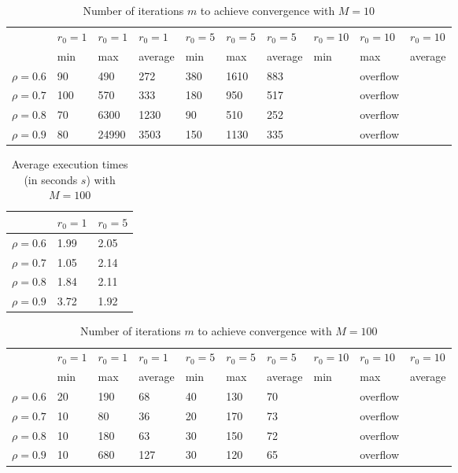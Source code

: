 \documentclass[a4paper,11pt,openright]{report}
\begin{document}
\begin{table}[H]
\centering
\addtolength{\leftskip}{-1.5cm}
\addtolength{\rightskip}{-1.5cm}
\begin{tabular}{|c|lllllllll|}
\hline
$ $ & $r_0 = 1$ & $r_0 = 1$ & $r_0 = 1$ & $r_0 = 5$ & $r_0 = 5$ & $r_0 = 5$ & $r_0 = 10$ & $r_0 = 10$ & $r_0 = 10$  \\
$ $ & min & max & average & min & max & average & min & max & average \\ 
\hline
$\rho = 0.6$ & 90 & 490 & 272 & 380 & 1610 & 883 &  & overflow &  \\

$\rho = 0.7$ & 100 & 570 & 333 & 180 & 950 & 517 &  & overflow &  \\

$\rho = 0.8$ & 70 & 6300 & 1230 & 90 & 510 & 252 &  & overflow & \\

$\rho = 0.9$ & 80 & 24990 & 3503 & 150 & 1130 & 335 &  & overflow & \\
\hline
\end{tabular}
\caption{Number of iterations $m$ to achieve convergence with $M = 10$}
\end{table}
\begin{table}[H]
\centering
\addtolength{\leftskip}{-1.5cm}
\addtolength{\rightskip}{-1.5cm}
\begin{tabular}{|c|ll|}
\hline
$ $ & $r_0 = 1$ & $r_0 = 5$ \\
\hline
$\rho = 0.6$ & 1.99 & 2.05  \\

$\rho = 0.7$ & 1.05 & 2.14  \\

$\rho = 0.8$ & 1.84 & 2.11  \\

$\rho = 0.9$ & 3.72 & 1.92  \\
\hline
\end{tabular}
\caption{Average execution
 times (in seconds $s$) with $M = 100$}
\end{table}
\begin{table}[H]
\centering
\addtolength{\leftskip}{-1.5cm}
\addtolength{\rightskip}{-1.5cm}
\begin{tabular}{|c|lllllllll|}
\hline
$ $ & $r_0 = 1$ & $r_0 = 1$ & $r_0 = 1$ & $r_0 = 5$ & $r_0 = 5$ & $r_0 = 5$ & $r_0 = 10$ & $r_0 = 10$ & $r_0 = 10$  \\
$ $ & min & max & average & min & max & average & min & max & average \\ 
\hline
$\rho = 0.6$ & 20 & 190 & 68 & 40 & 130 & 70 &  & overflow &  \\

$\rho = 0.7$ & 10 & 80 & 36 & 20 & 170 & 73 &  & overflow &  \\

$\rho = 0.8$ & 10 & 180 & 63 & 30 & 150 & 72 &  & overflow & \\

$\rho = 0.9$ & 10 & 680 & 127 & 30 & 120 & 65 &  & overflow & \\
\hline
\end{tabular}
\caption{Number of iterations $m$ to achieve convergence with $M = 100$}
\end{table}
\end{document}
